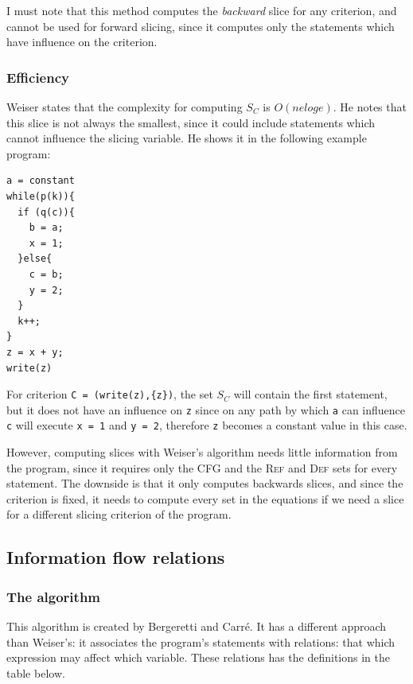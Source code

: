 \documentclass[oneside,12pt,a4paper]{book}
\begin{document}
I must note that this method computes the \textit{backward} slice for any criterion, and cannot be used for forward slicing, since it computes only the statements which have influence on the criterion.

\subsubsection{Efficiency}
Weiser states that the complexity for computing $S_C$ is $O(n e log e)$. He notes that this slice is not always the smallest, since it could include statements which cannot influence the slicing variable. He shows it in the following example program:
\begin{lstlisting}
a = constant
while(p(k)){
  if (q(c)){
    b = a;
    x = 1;
  }else{
  	c = b;
  	y = 2;
  }
  k++;
}
z = x + y;
write(z)
\end{lstlisting}

For criterion \texttt{C = (write(z),\{z\})}, the set $S_C$ will contain the first statement, but it does not have an influence on \texttt{z} since on any path by which \texttt{a} can influence \texttt{c} will execute \texttt{x = 1} and \texttt{y = 2}, therefore \texttt{z} becomes a constant value in this case. 

However, computing slices with Weiser's algorithm needs little information from the program, since it requires only the CFG and the \textsc{Ref} and \textsc{Def} sets for every statement.
The downside is that it only computes backwards slices, and since the criterion is fixed, it needs to compute every set in the equations if we need a slice for a different slicing criterion of the program.

\subsection{Information flow relations}
\subsubsection{The algorithm}
This algorithm is created by Bergeretti and Carré\cite{information-flow}. It has a different approach than Weiser's: it associates the program's statements with relations: that which expression may affect which variable. These relations has the definitions in the table below.
\end{document}
